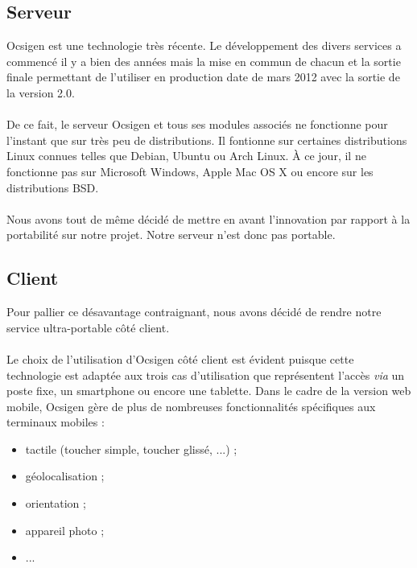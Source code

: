 \documentclass{life-fr}
\begin{document}
\subsection{Serveur}

Ocsigen est une technologie très récente. Le développement des divers services a
commencé il y a bien des années mais la mise en commun de chacun et la sortie
finale permettant de l'utiliser en production date de mars 2012 avec la sortie
de la version 2.0.\\
\\
De ce fait, le serveur Ocsigen et tous ses modules associés ne fonctionne
pour l'instant que sur très peu de distributions. Il fontionne sur certaines
distributions Linux connues telles que Debian, Ubuntu ou Arch Linux. À ce jour, 
il ne fonctionne pas sur Microsoft Windows, Apple Mac OS X ou encore sur les 
distributions BSD.\\
\\
Nous avons tout de même décidé de mettre en avant l'innovation par rapport
à la portabilité sur notre projet. Notre serveur n'est donc pas portable.

\subsection{Client}

Pour pallier ce désavantage contraignant, nous avons décidé de rendre notre
service ultra-portable côté client.\\
\\
Le choix de l'utilisation d'Ocsigen côté client est évident puisque cette 
technologie est adaptée aux trois cas d'utilisation que représentent l'accès
\textit{via} un poste fixe, un smartphone ou encore une tablette. Dans le cadre
de la version web mobile, Ocsigen gère de plus de nombreuses fonctionnalités 
spécifiques aux terminaux mobiles :
\begin{itemize}
  \item tactile (toucher simple, toucher glissé, ...) ;
  \item géolocalisation ;
  \item orientation ;
  \item appareil photo ;
  \item ...
\end{itemize}
\end{document}

